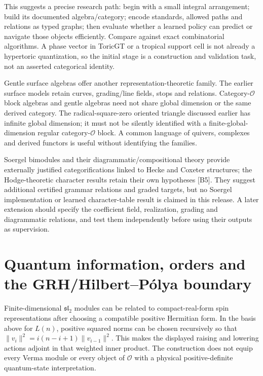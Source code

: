 This suggests a precise research path: begin with a small integral arrangement; build its documented algebra/category; encode standards, allowed paths and relations as typed graphs; then evaluate whether a learned policy can predict or navigate those objects efficiently. Compare against exact combinatorial algorithms. A phase vector in ToricGT or a tropical support cell is not already a hypertoric quantization, so the initial stage is a construction and validation task, not an asserted categorical identity.

Gentle surface algebras offer another representation-theoretic family. The earlier surface models retain curves, grading/line fields, stops and relations. Category-$\mathcal O$ block algebras and gentle algebras need not share global dimension or the same derived category. The radical-square-zero oriented triangle discussed earlier has infinite global dimension; it must not be silently identified with a finite-global-dimension regular category-$\mathcal O$ block. A common language of quivers, complexes and derived functors is useful without identifying the families.

Soergel bimodules and their diagrammatic/compositional theory provide externally justified categorifications linked to Hecke and Coxeter structures; the Hodge-theoretic character results retain their own hypotheses [B5]. They suggest additional certified grammar relations and graded targets, but no Soergel implementation or learned character-table result is claimed in this release. A later extension should specify the coefficient field, realization, grading and diagrammatic relations, and test them independently before using their outputs as supervision.

\section{Quantum information, orders and the GRH/Hilbert--P\'olya boundary}
\label{sec:wb-bgg-analytic}

Finite-dimensional $\mathfrak{sl}_2$ modules can be related to compact-real-form spin representations after choosing a compatible positive Hermitian form. In the basis above for $L(n)$, positive squared norms can be chosen recursively so that $\|v_i\|^2=i(n-i+1)\|v_{i-1}\|^2$. This makes the displayed raising and lowering actions adjoint in that weighted inner product. The construction does not equip every Verma module or every object of $\mathcal O$ with a physical positive-definite quantum-state interpretation.

